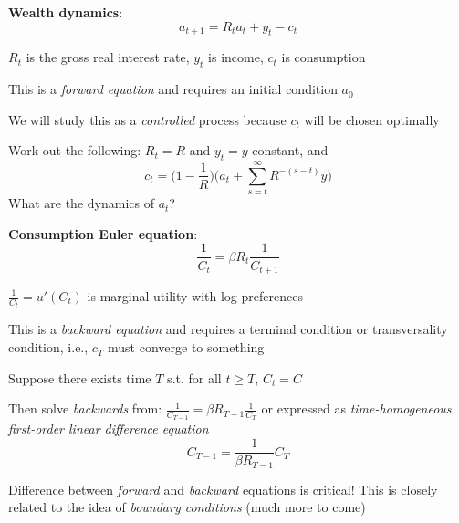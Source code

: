\documentclass[11pt, aspectratio=169]{beamer}
\newenvironment{witemize}{\itemize\addtolength{\itemsep}{10pt}}{\enditemize}
\begin{document}
\begin{frame}{}
\textbf{Wealth dynamics}:
\begin{equation*}
	a_{t+1} = R_t a_t + y_t - c_t
\end{equation*}
\begin{witemize}
	\item $R_t$ is the gross real interest rate, $y_t$ is income, $c_t$ is consumption
	
	\item This is a \textit{forward equation} and requires an initial condition $a_0$
	
	\item We will study this as a \textit{controlled} process because $c_t$ will be chosen optimally
	
	\item Work out the following: $R_t = R$ and $y_t = y$ constant, and  
	\begin{equation*}
		c_t = \bigg( 1 - \frac{1}{R} \bigg) \bigg(a_t + \sum_{s=t}^\infty R^{-(s-t)} y \bigg)
	\end{equation*}
	What are the dynamics of $a_t$?
\end{witemize}
\end{frame}


\begin{frame}{}
\textbf{Consumption Euler equation}:
\begin{equation*}
	\frac{1}{C_t} = \beta R_t\frac{1}{C_{t+1}}
\end{equation*}
\begin{witemize}
	\item $\frac{1}{C_t} = u'(C_t)$ is marginal utility with log preferences
	
	\item This is a \textit{backward equation} and requires a terminal condition or transversality condition, i.e., $c_T$ must converge to something
	
	\item Suppose there exists time $T$ s.t. for all $t \geq T$, $C_t = C$
	
	\item Then solve \textit{backwards} from: $\frac{1}{C_{T-1}} = \beta R_{T-1} \frac{1}{C_T}$ or expressed as \textit{time-homogeneous first-order linear difference equation}
	\begin{equation*}
		C_{T-1} = \frac{1}{\beta R_{T-1}} C_T
	\end{equation*}

	\item Difference between \textit{forward} and \textit{backward} equations is critical! This is closely related to the idea of \textit{boundary conditions} (much more to come)
\end{witemize}
\end{frame}
\end{document}
